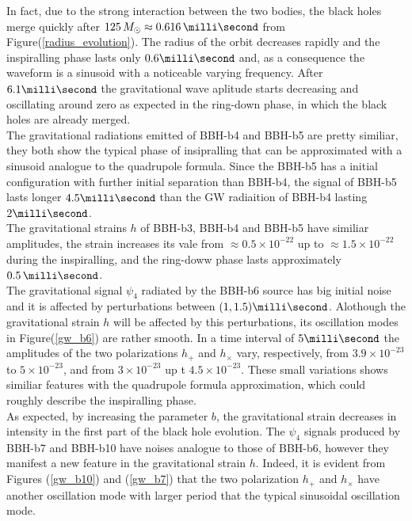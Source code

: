 In fact, due to the strong interaction between the two bodies, the black holes merge quickly after $125 \, M_{\odot} \approx 0.616 \, \milli \second$ from Figure(\ref{radius_evolution}). 
The radius of the orbit decreases rapidly and the inspiralling phase lasts only $0.6 \milli \second$ and, as a consequence the waveform is a sinusoid with a noticeable varying frequency.
After $6.1 \milli \second$ the gravitational wave aplitude starts decreasing and oscillating around zero as expected in the ring-down phase, in which the black holes are already merged. 
\\
The gravitational radiations emitted of BBH-b4 and BBH-b5 are pretty similiar, they both show the typical phase of insipralling that can be approximated with a sinusoid analogue to the quadrupole formula.
Since the BBH-b5 has a initial configuration with further initial separation than BBH-b4, the signal of BBH-b5 lasts longer $4.5 \milli \second$ than the GW radiaition of BBH-b4 lasting $2 \milli \second$.\\
The gravitational strains $h$ of BBH-b3, BBH-b4 and BBH-b5 have similiar amplitudes, the strain increases its vale from $\approx 0.5 \times 10^{-22}$ up to $\approx1.5 \times 10^{-22}$ during the inspiralling, and the ring-doww phase lasts approximately $0.5 \, \milli \second$.\\
The gravitational signal $\psi_4$ radiated by the BBH-b6 source has big initial noise and it is affected by perturbations between $(1,1.5) \milli \second$. 
Alothough the gravitational strain $h$ will be affected by this perturbations, its oscillation modes in Figure(\ref{gw_b6}) are rather smooth. 
In a time interval of $5 \milli \second$ the amplitudes of the two polarizations $h_+$ and $h_{\times}$ vary, respectively, from $3.9\times 10^{-23}$ to $5\times 10^{-23}$, and from $3\times 10^{-23}$ up t $4.5\times 10^{-23}$. 
These small variations shows similiar features with the quadrupole formula approximation, which could roughly describe the inspiralling phase.\\
As expected, by increasing the parameter $b$, the gravitational strain decreases in intensity in the first part of the black hole evolution.
The $\psi_4$ signals produced by BBH-b7 and BBH-b10 have noises analogue to those of BBH-b6, however they manifest  a new feature in the gravitational strain $h$.
Indeed, it is evident from Figures (\ref{gw_b10}) and (\ref{gw_b7}) that the two polarization $h_{+}$ and $h_{\times}$ have another oscillation mode with larger period that the typical sinusoidal oscillation mode.\\
